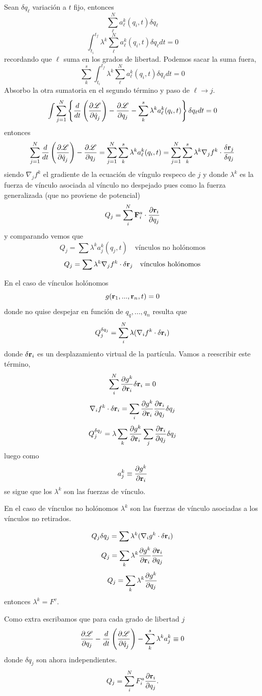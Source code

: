 \documentclass[10pt,oneside]{CBFT_article}
\begin{document}
Sean $\delta q_\ell$ variación a $t$ fijo, entonces 
\[
\sum_{\ell}^N a_\ell^k(q_i,t) \delta {q}_\ell
\]
\[
\int_{t_i}^{t_f} \lambda^k \sum_{\ell}^N a_\ell^k(q_i,t) \delta {q}_\ell dt = 0
\]
recordando que $\ell$ suma en los grados de libertad. Podemos sacar la suma fuera,
\[
\sum_{k}^s \int_{t_i}^{t_f} \lambda^k \sum_{\ell}^N a_\ell^k(q_i,t) \delta {q}_\ell dt = 0
\]
Absorbo la otra sumatoria en el segundo término y paso de $\ell \to j$.
\[
\int  \sum_{j=1}^N \left\{ \frac{d}{dt}\left( \frac{\partial^{\hspace{-0.05em}} {\mathscr{L}}}{\partial {\dot{q}_j}^{\hspace{-0.05em}}} \right) -\frac{\partial^{\hspace{-0.05em}} {\mathscr{L}}}{\partial {q_j}^{\hspace{-0.05em}}}
- \sum_{k}^s \lambda^k a_\ell^k(q_i,t) \right\} \delta {q}_\ell dt = 0
\]
entonces 
\[
\sum_{j=1}^N \frac{d}{dt}\left( \dpar{\Lag}{\dot{q}_j} \right) -\dpar{\Lag}{q_j} =
\sum_{j=1}^N \sum_{k}^s \lambda^k a_\ell^k(q_i,t) =  
\sum_{j=1}^N \sum_{k}^s \lambda^k \nabla_j f^k \cdot \frac{\delta \vb{r}_j}{\delta q_j} 
\]
siendo $\nabla_j f^k $ el gradiente de la ecuación de víngulo respeco de $j$ y donde $\lambda^k$
es la fuerza de vínculo asociada al vínculo no despejado pues como la fuerza generalizada
(que no proviene de potencial)
\[
Q_j = \sum_i^N \vb{F}_i^a \cdot \dpar{\vb{r}_i}{q_j}
\]
y comparando vemos que 
\[
Q_j = \sum \lambda^k a^k_j(q_j,t) \quad \textrm{vínculos no holónomos}
\]
\[
Q_j=  \sum \lambda^k \nabla_j f^k \cdot \delta \vb{r}_j  \quad \textrm{vínculos holónomos}
\]

En el caso de vínculos holónomos 
\[
g(\vb{r}_1,...,\vb{r}_n,t) = 0 
\]
donde no quise despejar en función de $q_q,...,q_n$ resulta que 
\[
Q_j^{\delta q_j} =  \sum_i^N \lambda (\nabla_i f^k\cdot\delta\vb{r}_i)
\]
donde $\delta\vb{r}_i$ es un desplazamiento virtual de la partícula.
Vamos a reescribir este término,
\[
\sum_i^N \dpar{g^k}{\vb{r}_i} \delta \vb{r}_i = 0
\]
\[
\nabla_i f^k\cdot\delta\vb{r}_i = \sum_i \dpar{g^k}{\vb{r}_i} \dpar{\vb{r}_i}{q_j} \delta q_j
\]
\[
Q_j^{\delta q_j} =  \lambda \sum_k \dpar{g^k}{\vb{r}_i} \sum_j \dpar{\vb{r}_i}{q_j} \delta q_j
\]
luego como 
\[
a^k_j \equiv \dpar{g^k}{\vb{r}_i}
\]
se sigue que los $\lambda^k$ son las fuerzas de vínculo.

En el caso de vínculos no holónomos $\lambda^k$ son las fuerzas de vínculo asociadas a los 
vínculos no retirados.

\[
Q_j {\delta q_j} =  \sum \lambda^k (\nabla_i g^k\cdot\delta\vb{r}_i)
\]
\[
Q_j =  \sum_k \lambda^k \dpar{g^k}{\vb{r}_i} \dpar{\vb{r}_i}{q_j}
\]
\[
Q_j =  \sum_k \lambda^k \frac{\partial^{\hspace{-0.05em}} {g^k}}{\partial {q_j}^{\hspace{-0.05em}}}
\]
entonces $\lambda^k=F^v$.

Como extra escribamos que para cada grado de libertad $j$ 
\[
\frac{\partial^{\hspace{-0.05em}} {\mathscr{L}}}{\partial {q_j}^{\hspace{-0.05em}}} - \frac{d}{dt}\left( \frac{\partial^{\hspace{-0.05em}} {\mathscr{L}}}{\partial {\dot{q}_j}^{\hspace{-0.05em}}} \right) - \sum_k^s \lambda^k a_j^k \equiv 0
\]
donde $\delta q_j$ son ahora independientes.
\[
Q_j = \sum_i^N F_i^a \dpar{\vb{r}_i}{q_j}. 
\]
\end{document}
